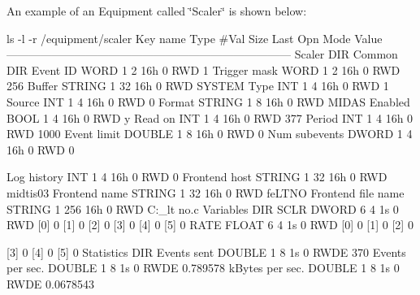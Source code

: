 An example of an Equipment called \char`\"{}Scaler\char`\"{} is shown below: 
\begin{DoxyCode}
[local:S]ls -l -r /equipment/scaler
Key name                        Type    #Val  Size  Last Opn Mode Value
---------------------------------------------------------------------------
Scaler                          DIR
    Common                      DIR
        Event ID                WORD    1     2     16h  0   RWD  1
        Trigger mask            WORD    1     2     16h  0   RWD  256
        Buffer                  STRING  1     32    16h  0   RWD  SYSTEM
        Type                    INT     1     4     16h  0   RWD  1
        Source                  INT     1     4     16h  0   RWD  0
        Format                  STRING  1     8     16h  0   RWD  MIDAS
        Enabled                 BOOL    1     4     16h  0   RWD  y
        Read on                 INT     1     4     16h  0   RWD  377
        Period                  INT     1     4     16h  0   RWD  1000
        Event limit             DOUBLE  1     8     16h  0   RWD  0
        Num subevents           DWORD   1     4     16h  0   RWD  0

        Log history             INT     1     4     16h  0   RWD  0
        Frontend host           STRING  1     32    16h  0   RWD  midtis03
        Frontend name           STRING  1     32    16h  0   RWD  feLTNO
        Frontend file name      STRING  1     256   16h  0   RWD  C:\online\sc_lt
      no.c
    Variables                   DIR
        SCLR                    DWORD   6     4     1s   0   RWD  
                                        [0]             0
                                        [1]             0
                                        [2]             0
                                        [3]             0
                                        [4]             0
                                        [5]             0
        RATE                    FLOAT   6     4     1s   0   RWD  
                                        [0]             0
                                        [1]             0
                                        [2]             0

                                        [3]             0
                                        [4]             0
                                        [5]             0
    Statistics                  DIR
        Events sent             DOUBLE  1     8     1s   0   RWDE 370
        Events per sec.         DOUBLE  1     8     1s   0   RWDE 0.789578
        kBytes per sec.         DOUBLE  1     8     1s   0   RWDE 0.0678543
\end{DoxyCode}
